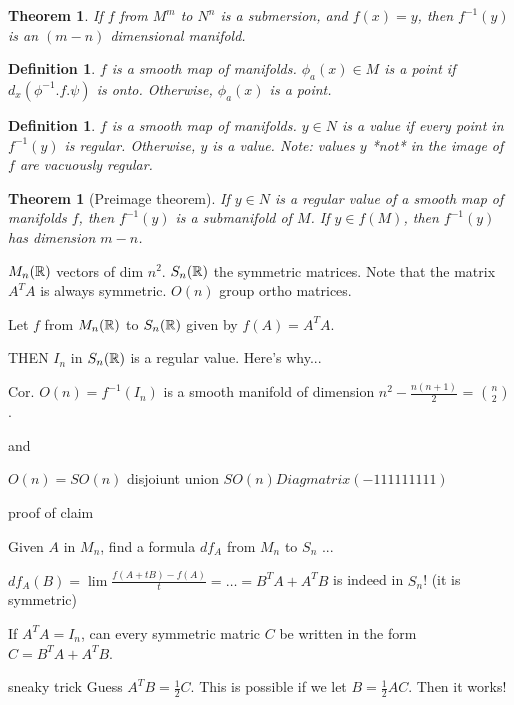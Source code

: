 \documentclass[11pt]{amsbook}
\theoremstyle{mystyle} \newtheorem{thrm}[thm]{Theorem}
\theoremstyle{mystyle} \newtheorem{defi}[thm]{Definition}
\theoremstyle{mystyle} \newtheorem{coro}[thm]{Corollary}
\theoremstyle{mystyle} \newtheorem{propo}[thm]{Proposition}
\theoremstyle{mystyle} \newtheorem{lemm}[thm]{Lemma}
\numberwithin{thm}{section}
\begin{document}
\begin{thrm}
	If $f$ from $M^m$ to $N^n$ is a submersion, and $f(x) = y$, then $f^{-1}(y)$ is an $(m-n)$ dimensional manifold.
\end{thrm}

\begin{defi}
	$f$ is a smooth map of manifolds.
	$\phi_a(x) \in M$ is a  point if $d_x(\phi^{-1}.f.\psi)$ is onto.  Otherwise, $\phi_a(x)$ is a  point.
\end{defi}

\begin{defi}
	$f$ is a smooth map of manifolds.
	$y \in N$ is a  value if every point in $f^{-1}(y)$ is regular.  Otherwise, $y$ is a  value.  Note: values $y$ *not* in the image of $f$ are vacuously regular.
\end{defi}

\begin{thrm}[Preimage theorem]
	If $y \in N$ is a regular value of a smooth map of manifolds $f$, then $f^{-1}(y)$ is a submanifold of $M$.  If $y \in f(M)$, then $f^{-1}(y)$ has dimension $m-n$.
\end{thrm}

\begin{example}
	$M_n({\mathbb R})$ vectors of dim $n^2$.  $S_n({\mathbb R})$ the symmetric matrices.  Note that the matrix $A^T A$ is always symmetric.  $O(n)$ group ortho matrices.

	Let $f$ from $M_n({\mathbb R})$ to $S_n({\mathbb R})$ given by $f(A) = A^T A$.

	THEN $I_n$ in $S_n({\mathbb R})$ is a regular value.  Here's why...

	Cor. $O(n) = f^{-1}(I_n)$ is a smooth manifold of dimension $n^2 - \frac{n(n+1)}{2}$ = $\binom n2$.

	and

	$O(n) = SO(n)$ disjoiunt union $SO(n)Diagmatrix(-1 1 1 1 1 1 1 1 1)$

	proof of claim

	Given $A$ in $M_n$, find a formula $df_A$ from $M_n$ to $S_n$ ...

	$df_A(B) = \lim \frac{f(A+tB) - f(A)}{t} = \ldots = B^T A + A^T B$
	is indeed in $S_n$! (it is symmetric)

	If $A^T A = I_n$, can every symmetric matric $C$ be written in the form $C = B^T A + A^T B$.

	sneaky trick
	Guess $A^T B = \frac12 C$.
	This is possible if we let $B = \frac12 AC$.
	Then it works!
\end{example}
\end{document}

